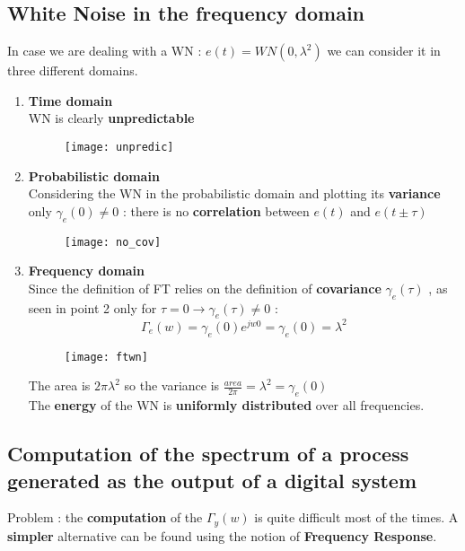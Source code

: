 \subsection{White Noise in the frequency domain}
In case we are dealing with a WN : $ e(t) = WN(0,\lambda^2)$ we can consider it in three different domains.
\begin{enumerate}
\item \textbf{Time domain}\\
WN is clearly \textbf{unpredictable}
\begin{figure}[H]
 \centering
  \texttt{[image: unpredic]}
\end{figure}

\item \textbf{Probabilistic domain}\\
Considering the WN in the probabilistic domain and plotting its \textbf{variance} only $ \gamma_e(0) \neq 0 $ : there is no \textbf{correlation} between $ e(t) $ and $ e(t \pm \tau) $ 
\begin{figure}[H]
 \centering
  \texttt{[image: no\_cov]}
\end{figure}
\item \textbf{Frequency domain}\\
Since the definition of FT relies on the definition of \textbf{covariance} $ \gamma_e(\tau) $ , as seen in point 2 only for $ \tau = 0 \to \gamma_e(\tau) \neq 0$ : 
\[
\boxed{\Gamma_e(w) = \gamma_e(0)e^{jw0} = \gamma_e(0) = \lambda^2}
\]
\begin{figure}[H]
 \centering
  \texttt{[image: ftwn]}
\end{figure}
The area is $ 2\pi\lambda^2$  so the variance is $ \frac{area}{2\pi} = \lambda^2 = \gamma_e(0)$\\
The \textbf{energy} of the WN is \textbf{uniformly distributed} over all frequencies.
\end{enumerate}

\subsection{Computation of the spectrum of a process generated as the output of a digital system}
Problem : the \textbf{computation} of the $\Gamma_y(w)$ is quite difficult most of the times. A \textbf{simpler} alternative can be found using the notion of \textbf{Frequency Response}.

